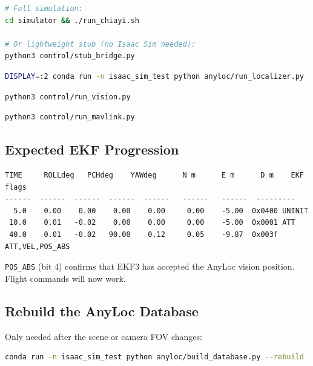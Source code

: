 \documentclass[11pt,a4paper]{article}
\begin{document}
\begin{lstlisting}[language=bash, numbers=none, caption={Terminal 2 --- Isaac Sim (or stub)}]
# Full simulation:
cd simulator && ./run_chiayi.sh

# Or lightweight stub (no Isaac Sim needed):
python3 control/stub_bridge.py
\end{lstlisting}

\begin{lstlisting}[language=bash, numbers=none, caption={Terminal 3 --- AnyLoc localizer}]
DISPLAY=:2 conda run -n isaac_sim_test python anyloc/run_localizer.py
\end{lstlisting}

\begin{lstlisting}[language=bash, numbers=none, caption={Terminal 4 --- Vision bridge (AnyLoc -> EKF3)}]
python3 control/run_vision.py
\end{lstlisting}

\begin{lstlisting}[language=bash, numbers=none, caption={Terminal 5 --- MAVLink monitor}]
python3 control/run_mavlink.py
\end{lstlisting}

\subsection*{Expected EKF Progression}

\begin{lstlisting}[numbers=none]
TIME     ROLLdeg   PCHdeg    YAWdeg      N m      E m      D m    EKF flags
------  ------  ------  ------  ------   ------   ------  ---------
  5.0    0.00    0.00    0.00    0.00     0.00    -5.00  0x0400 UNINIT
 10.0    0.01   -0.02    0.00    0.00     0.00    -5.00  0x0001 ATT
 40.0    0.01   -0.02   90.00    0.12     0.05    -9.87  0x003f ATT,VEL,POS_ABS
\end{lstlisting}

\texttt{POS\_ABS} (bit 4) confirms that EKF3 has accepted the AnyLoc vision position.
Flight commands will now work.

\subsection*{Rebuild the AnyLoc Database}

Only needed after the scene or camera FOV changes:

\begin{lstlisting}[language=bash, numbers=none]
conda run -n isaac_sim_test python anyloc/build_database.py --rebuild
\end{lstlisting}
\end{document}
